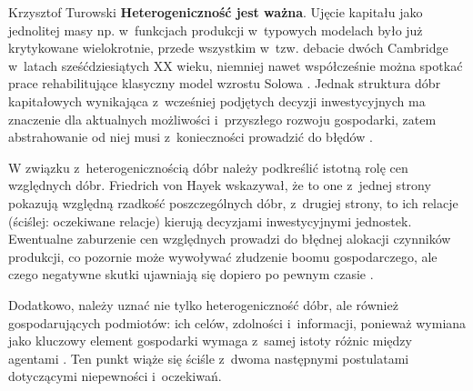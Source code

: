 \begin{artplenv}{Krzysztof Turowski}
\textbf{Heterogeniczność jest ważna}. Ujęcie kapitału jako jednolitej masy np. w~funkcjach produkcji w~typowych modelach
było już krytykowane wielokrotnie, przede wszystkim w~tzw. debacie dwóch Cambridge w~latach sześćdziesiątych XX wieku,
niemniej nawet współcześnie można spotkać prace rehabilitujące klasyczny model wzrostu Solowa
\parencite{mankiw_contribution_1992}.
Jednak struktura dóbr kapitałowych wynikająca z~wcześniej podjętych
decyzji inwestycyjnych ma znaczenie dla aktualnych możliwości i~przyszłego rozwoju gospodarki, zatem abstrahowanie od
niej musi z~konieczności prowadzić do błędów
\parencite{skousen_structure_2007}.

W związku z~heterogenicznością dóbr należy podkreślić istotną rolę cen względnych dóbr. Friedrich von Hayek wskazywał,
że to one z~jednej strony pokazują względną rzadkość poszczególnych dóbr, z~drugiej strony, to ich relacje (ściślej:
oczekiwane relacje) kierują decyzjami inwestycyjnymi jednostek. Ewentualne zaburzenie cen względnych prowadzi do
błędnej alokacji czynników produkcji, co pozornie może wywoływać złudzenie boomu gospodarczego, ale czego negatywne
skutki ujawniają się dopiero po pewnym czasie
\parencite{hayek_prices_1931,mises_ludzkie_2007}.

Dodatkowo, należy uznać nie tylko heterogeniczność dóbr, ale również gospodarujących podmiotów: ich celów,
zdolności i~informacji, ponieważ wymiana jako kluczowy element gospodarki wymaga z~samej istoty różnic między agentami
\parencite{colander_financial_2009}.
Ten punkt wiąże się ściśle z~dwoma następnymi
postulatami dotyczącymi niepewności i~oczekiwań.


\end{artplenv}
